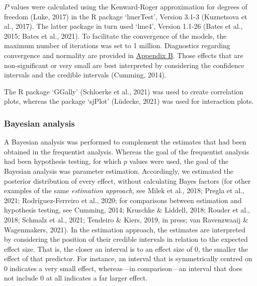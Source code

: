 \documentclass[
  12pt,
  man,floatsintext]{apa7}
\begin{document}
\(P\) values were calculated using the Kenward-Roger approximation for degrees of freedom (Luke, 2017) in the R package `lmerTest', Version 3.1-3 (Kuznetsova et al., 2017). The latter package in turn used `lme4', Version 1.1-26 (Bates et al., 2015; Bates et al., 2021). To facilitate the convergence of the models, the maximum number of iterations was set to 1 million. Diagnostics regarding convergence and normality are provided in \protect\hyperlink{appendix-B-frequentist-analysis-diagnostics}{\underline{Appendix B}}. Those effects that are non-significant or very small are best interpreted by considering the confidence intervals and the credible intervals (Cumming, 2014).

The R package `GGally' (Schloerke et al., 2021) was used to create correlation plots, whereas the package `sjPlot' (Lüdecke, 2021) was used for interaction plots.

\hypertarget{bayesian-analysis}{%
\subsubsection{Bayesian analysis}\label{bayesian-analysis}}

A Bayesian analysis was performed to complement the estimates that had been obtained in the frequentist analysis. Whereas the goal of the frequentist analysis had been hypothesis testing, for which \(p\) values were used, the goal of the Bayesian analysis was parameter estimation. Accordingly, we estimated the posterior distribution of every effect, without calculating Bayes factors (for other examples of the same \emph{estimation approach}, see Milek et al., 2018; Pregla et al., 2021; Rodríguez-Ferreiro et al., 2020; for comparisons between estimation and hypothesis testing, see Cumming, 2014; Kruschke \& Liddell, 2018; Rouder et al., 2018; Schmalz et al., 2021; Tendeiro \& Kiers, 2019, in press; van Ravenzwaaij \& Wagenmakers, 2021). In the estimation approach, the estimates are interpreted by considering the position of their credible intervals in relation to the expected effect size. That is, the closer an interval is to an effect size of 0, the smaller the effect of that predictor. For instance, an interval that is symmetrically centred on 0 indicates a very small effect, whereas---in comparison---an interval that does not include 0 at all indicates a far larger effect.
\end{document}

